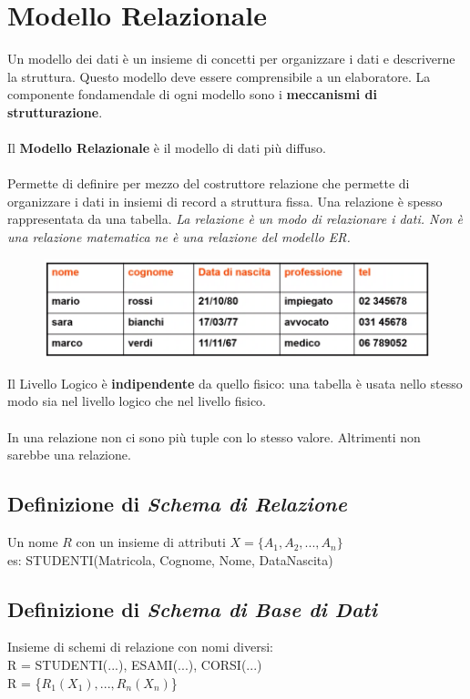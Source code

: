 \documentclass[12pt, a4paper]{article}
\begin{document}
    \section{Modello Relazionale}
    Un modello dei dati è un insieme di concetti per organizzare i dati 
    e descriverne la struttura. Questo modello deve essere comprensibile a un elaboratore.
    La componente fondamendale di ogni modello sono i \textbf{meccanismi di strutturazione}.
    \\\\Il \textbf{Modello Relazionale} è il modello di dati più diffuso.
    \\\\Permette di definire per mezzo del costruttore relazione che permette di organizzare
    i dati in insiemi di record a struttura fissa. Una relazione è spesso rappresentata da una tabella.
    \textit{La relazione è un modo di relazionare i dati. Non è una relazione matematica ne è una relazione del modello ER.}

    \begin{figure}[htbp]
        \centering
        \includegraphics[scale=0.5]{rel.png}
    \end{figure}

    Il Livello Logico è \textbf{indipendente} da quello fisico: una tabella è usata nello stesso modo
    sia nel livello logico che nel livello fisico.
    \\\\
    In una relazione non ci sono più tuple con lo stesso valore. Altrimenti non sarebbe una relazione.

    \subsection*{Definizione di \textit{Schema di Relazione}}
    Un nome $R$ con un insieme di attributi $X = \{A_1, A_2, ..., A_n\}$\\
    es: STUDENTI(Matricola, Cognome, Nome, DataNascita)

    \subsection*{Definizione di \textit{Schema di Base di Dati}}
    Insieme di schemi di relazione con nomi diversi:
    \\R = {STUDENTI(...), ESAMI(...), CORSI(...)}
    \\R = \{$R_1(X_1), ..., R_n(X_n)$\}
\end{document}
